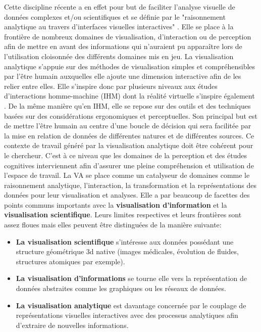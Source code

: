 Cette discipline récente a en effet pour but de faciliter l'analyse visuelle de données complexes et/ou scientifiques et se définie par le "raisonnement analytique au travers d'interfaces visuelles interactives" \cite{cook_illuminating_2005}. Elle se place à la frontière de nombreux domaines de visualisation, d'interaction ou de perception afin de mettre en avant des informations qui n'auraient pu apparaître lors de l'utilisation cloisonnée des différents domaines mis en jeu. La visualisation analytique s'appuie sur des méthodes de visualisation simples et compréhensibles par l'être humain auxquelles elle ajoute une dimension interactive afin de les relier entre elles. Elle s'inspire donc par plusieurs niveaux aux études d'interactions homme-machine (IHM) dont la réalité virtuelle s'inspire également \cite{arias-hernandez_visual_2011}. De la même manière qu'en IHM, elle se repose sur des outils et des techniques basées sur des considérations ergonomiques et perceptuelles. Son principal but est de mettre l'être humain au centre d'une boucle de décision qui sera facilitée par la mise en relation de données de différentes natures et de différentes sources. Ce contexte de travail généré par la visualisation analytique doit être cohérent pour le chercheur. C'est à ce niveau que les domaines de la perception et des études cognitives interviennent afin d'assurer une pleine compréhension et utilisation de l'espace de travail. La VA se place comme un catalyseur de domaines comme le raisonnement analytique, l'interaction, la transformation et la représentations des données pour leur visualisation et analyses.
Elle a par beaucoup de facettes des points communs importants avec la \textbf{visualisation d'information} et la \textbf{visualisation scientifique}. Leurs limites respectives et leurs frontières sont assez floues mais elles peuvent être distinguées de la manière suivante:

\begin{itemize}
	\item \textbf{La visualisation scientifique} s'intéresse aux données possédant une structure géométrique 3d native (images médicales, évolution de fluides, structures atomiques par exemple).
	\item \textbf{La visualisation d'informations} se tourne elle vers la représentation de données abstraites comme les graphiques ou les réseaux de données.
	\item \textbf{La visualisation analytique} est davantage concernée par le couplage de représentations visuelles interactives avec des processus analytiques afin d'extraire de nouvelles informations.
\end{itemize}

